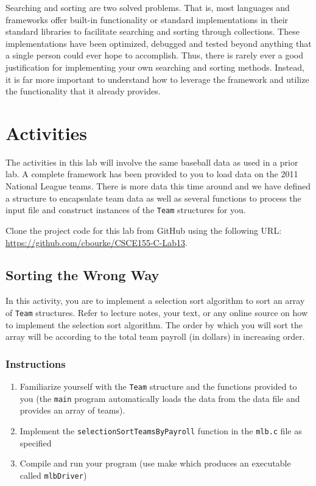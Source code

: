 \documentclass[12pt]{scrartcl}
\begin{document}
Searching and sorting are two solved problems.  That is, most 
languages and frameworks offer built-in functionality or 
standard implementations in their standard libraries to facilitate 
searching and sorting through collections.  These implementations 
have been optimized, debugged and tested beyond anything that 
a single person could ever hope to accomplish.  Thus, there is 
rarely ever a good justification for implementing your own 
searching and sorting methods.  Instead, it is far more important 
to understand how to leverage the framework and utilize the 
functionality that it already provides.  

\section{Activities}

The activities in this lab will involve the same baseball data as 
used in a prior lab.  A complete framework has been provided 
to you to load data on the 2011 National League teams.  There 
is more data this time around and we have defined a structure 
to encapsulate team data as well as several functions to process 
the input file and construct instances of the \texttt{Team} 
structures for you.

Clone the project code for this lab from GitHub using the following 
URL: \url{https://github.com/cbourke/CSCE155-C-Lab13}.

\subsection{Sorting the Wrong Way}

In this activity, you are to implement a selection sort algorithm to 
sort an array of \texttt{Team} structures.  Refer to lecture notes, 
your text, or any online source on how to implement the selection sort 
algorithm.  The order by which you will sort the array will be according 
to the total team payroll (in dollars) in increasing order.

\subsubsection*{Instructions}

\begin{enumerate}
  \item Familiarize yourself with the \texttt{Team} structure and 
	the functions provided to you (the \texttt{main} program 
	automatically loads the data from the data file and provides an 
	array of teams).  
  \item Implement the \texttt{selectionSortTeamsByPayroll} 
	function in the \texttt{mlb.c} file as specified
  \item Compile and run your program (use make which produces an 
	executable called \texttt{mlbDriver})
\end{enumerate}
\end{document}
